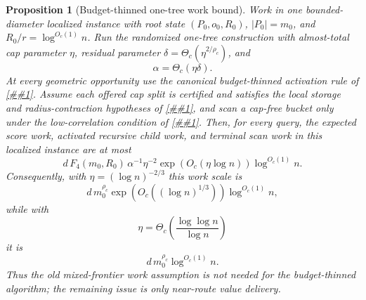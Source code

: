\documentclass[10pt]{article}
\newcommand{\cref}[1]{\ref{##1}}
\newtheorem{proposition}[theorem]{Proposition}
\theoremstyle{definition}
\begin{document}
\begin{proposition}[Budget-thinned one-tree work bound]
   \label{prop:budget-thinned-work}
   Work in one bounded-diameter localized instance with root state
   \((P_0,o_0,R_0)\), \(|P_0|=m_0\), and \(R_0/r=\log^{O_c(1)}n\).  Run the
   randomized one-tree construction with almost-total cap parameter \(\eta\),
   residual parameter \(\delta=\Theta_c(\eta^{2/\rho_c})\), and
   \[
      \alpha=\Theta_c(\eta\delta).
   \]
   At every geometric opportunity use the canonical budget-thinned activation
   rule of \cref{lem:budget-thinned-opportunities}.  Assume each offered cap
   split is certified and satisfies the local storage and radius-contraction
   hypotheses of \cref{lem:thin-cap-contraction}, and scan a cap-free bucket
   only under the low-correlation condition of
   \cref{lem:cap-free-scan-accounting}.  Then, for every query, the expected
   score work, activated recursive child work, and terminal scan work in this
   localized instance are at most
   \[
      d\,F_4(m_0,R_0)\,
      \alpha^{-1}\eta^{-2}
      \exp(O_c(\eta\log n))\log^{O_c(1)}n .
      \tag{BW1}
   \]
   Consequently, with \(\eta=(\log n)^{-2/3}\) this work scale is
   \[
      d\,m_0^{\rho_c}
      \exp(O_c((\log n)^{1/3}))\log^{O_c(1)}n,
   \]
   while with
   \[
      \eta=\Theta_c\!\left(\frac{\log\log n}{\log n}\right)
   \]
   it is
   \[
      d\,m_0^{\rho_c}\log^{O_c(1)}n .
   \]
   Thus the old mixed-frontier work assumption is not needed for the
   budget-thinned algorithm; the remaining issue is only near-route value
   delivery.
\end{proposition}
\end{document}
